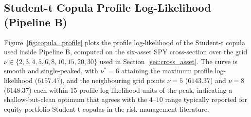 \begin{table}[h]
\centering
\small
\caption{\textbf{Walk-forward (quarterly CHMM-N refit) vs fixed-IS CHMM-N on JNJ and JPM} (Pipeline A, per-ticker independent fits; walk-forward only rolls the fit window, it does not introduce cross-asset dependence). $K = 18$, 1000 simulated paths per (ticker, mode), seed = 20260420. IS window 2014-01-03 through 2024-01-03; OoS window 2024-01-04 through 2026-04-17 ($T_{\text{OoS}} = 572$). The walk-forward mode refits the CHMM-N every 63 trading days across the OoS window, feeding each completed quarter's realized returns back into the training set before the next refit. Columns report percent KS / AD pass rate at $\alpha = 0.05$, excess kurtosis, ACF-MAE of $|G_t|$, Wasserstein-1, and Hellinger distance.}
\label{tab:walk_forward}
\end{table}

\subsection{Student-t Copula Profile Log-Likelihood (Pipeline B)}
\label{sec:copula_profile_supp}

Figure~\ref{fig:copula_profile} plots the profile log-likelihood of the Student-t copula used inside Pipeline B, computed on the six-asset SPY cross-section over the grid $\nu \in \{2, 3, 4, 5, 6, 8, 10, 15, 20, 30\}$ used in Section~\ref{sec:cross_asset}.
The curve is smooth and single-peaked, with $\nu^{*} = 6$ attaining the maximum profile log-likelihood ($6157.47$), and the neighbouring grid points $\nu = 5$ ($6143.37$) and $\nu = 8$ ($6148.37$) each within $15$ profile-log-likelihood units of the peak, indicating a shallow-but-clean optimum that agrees with the $4$--$10$ range typically reported for equity-portfolio Student-t copulas in the risk-management literature.

